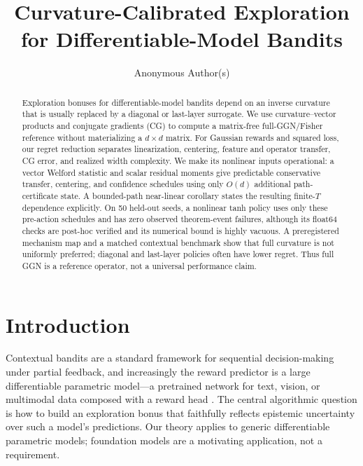\documentclass[twoside]{article}
\title{Curvature-Calibrated Exploration for Differentiable-Model Bandits}
\author{Anonymous Author(s)}
\newif\ifprovisional\provisionalfalse %
\begin{document}
\ifprovisional
  \maketitle
\else
\fi

\begin{abstract}
Exploration bonuses for differentiable-model bandits depend on an inverse
curvature that is usually replaced by a diagonal or last-layer surrogate.  We use
curvature--vector products and conjugate gradients (CG) to compute a matrix-free
full-GGN/Fisher reference without materializing a $d\times d$ matrix.  For Gaussian
rewards and squared loss, our regret reduction separates linearization, centering,
feature and operator transfer, CG error, and realized width complexity.  We make its
nonlinear inputs operational: a vector Welford statistic and scalar residual moments
give predictable conservative transfer, centering, and confidence schedules using
only $O(d)$ additional path-certificate state.  A bounded-path near-linear
corollary states the resulting finite-$T$ dependence explicitly.  On 50 held-out
seeds, a nonlinear tanh policy uses only these pre-action schedules and has zero
observed theorem-event failures, although its float64 checks are post-hoc verified
and its numerical bound is highly vacuous.  A preregistered mechanism map and a
matched contextual benchmark show that full curvature is not uniformly preferred;
diagonal and last-layer policies often have lower regret.  Thus full GGN is a
reference operator, not a universal performance claim.
\end{abstract}

\section{Introduction}\label{sec:intro}

Contextual bandits are a standard framework for sequential
decision-making under partial feedback, and increasingly the reward
predictor is a large differentiable parametric model---a pretrained
network for text, vision, or multimodal data composed with a reward head
\citep{zhou2020neural,riquelme2018deep}.  The central algorithmic
question is how to build an exploration bonus that faithfully reflects
epistemic uncertainty over such a model's predictions.  Our theory
applies to generic differentiable parametric models; foundation models
are a motivating application, not a requirement.
\end{document}
